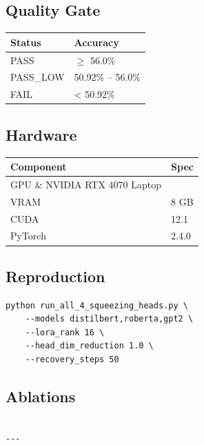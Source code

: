 \subsection{Quality Gate}

\begin{table}[H]
\centering
\small
\begin{tabular}{ll}
\toprule
\textbf{Status} & \textbf{Accuracy} \\
\midrule
PASS & $\ge$ 56.0\% \\
PASS\_LOW & 50.92\% -- 56.0\% \\
FAIL & < 50.92\% \\
\bottomrule
\end{tabular}
\end{table}

\subsection{Hardware}

\begin{table}[H]
\centering
\small
\begin{tabular}{ll}
\toprule
\textbf{Component} & \textbf{Spec} \\
\midrule
GPU \& NVIDIA RTX 4070 Laptop \\
VRAM & 8 GB \\
CUDA & 12.1 \\
PyTorch & 2.4.0 \\
\bottomrule
\end{tabular}
\end{table}

\subsection{Reproduction}

\begin{lstlisting}
python run_all_4_squeezing_heads.py \
    --models distilbert,roberta,gpt2 \
    --lora_rank 16 \
    --head_dim_reduction 1.0 \
    --recovery_steps 50
\end{lstlisting}

\subsection{Ablations}

\begin{lstlisting}

---
\end{lstlisting}